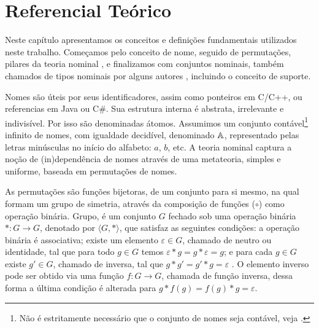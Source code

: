 \chapter{Referencial Teórico}\label{chp:ref-teorico}

Neste capítulo apresentamos os conceitos e definições fundamentais utilizados neste trabalho. Começamos pelo conceito de nome, seguido de permutações, pilares da teoria nominal \cite{Gabbay2002,Pitts2003,Pitts2013}, e finalizamos com conjuntos nominais, também chamados de tipos nominais por alguns autores \cite{Urban2008,Choudhury2015}, incluindo o conceito de suporte.

Nomes são úteis por seus identificadores, assim como ponteiros em C/C++, ou referencias em Java ou C\#. Sua estrutura interna é abstrata, irrelevante e indivisível. Por isso são denominadas átomos. Assumimos um conjunto contável\footnote{Não é estritamente necessário que o conjunto de nomes seja contável, veja \cite[Exercício 6.2, página 109]{Pitts2013}.} infinito de nomes, com igualdade decidível, denominado $\mathbb{A}$, representado pelas letras minúsculas no início do alfabeto: $a$, $b$, etc. A teoria nominal captura a noção de (in)dependência de nomes através de uma metateoria, simples e uniforme, baseada em permutações de nomes.

As permutações são funções bijetoras, de um conjunto para si mesmo, na qual formam um grupo de simetria, através da composição de funções ($\circ$) como operação binária.
Grupo, é um conjunto $G$ fechado sob uma operação binária $* : G \rightarrow G$, denotado por $\langle G, * \rangle$, que satisfaz as seguintes condições: a operação binária é associativa; existe um elemento $\varepsilon \in G$, chamado de neutro ou identidade, tal que para todo $g \in G$ temos $\varepsilon * g = g * \varepsilon = g$; e para cada $g \in G$ existe $g' \in G$, chamado de inversa, tal que $g*g' = g'*g = \varepsilon$ \cite{Fraleigh2002}. O elemento inverso pode ser obtido via uma função $f : G \rightarrow G$, chamada de função inversa, dessa forma a última condição é alterada para $g*f(g) = f(g)*g = \varepsilon$.

